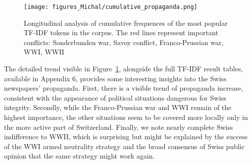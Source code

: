 \documentclass[11pt]{article}
\begin{document}
\begin{figure}[H]
    \centering
    \texttt{[image: figures\_Michal/cumulative\_propaganda.png]}
    \caption{Longitudinal analysis of cumulative frequences of the most popular TF-IDF tokens in the corpus. The red lines represent important conflicts: Sonderbunden war, Savoy conflict, Franco-Prussian war, WWI, WWII}
    \label{fig:cumulative_propaganda}
\end{figure}

The detailed trend visible in Figure~\ref{fig:cumulative_propaganda}, alongside the full TF-IDF result tables, available in Appendix 6, provides some interesting insights into the Swiss newspapers' propaganda. First, there is a visible trend of propaganda increase, consistent with the appearance of political situations dangerous for Swiss integrity. Secondly, while the Franco-Prussian war and WWI remain of the highest importance, the other situations seem to be covered more locally only in the more active part of Switzerland. Finally, we note nearly complete Swiss indifference to WWII, which is surprising but might be explained by the success of the WWI armed neutrality strategy and the broad consensus of Swiss public opinion that the same strategy might work again.


\newpage
\end{document}

